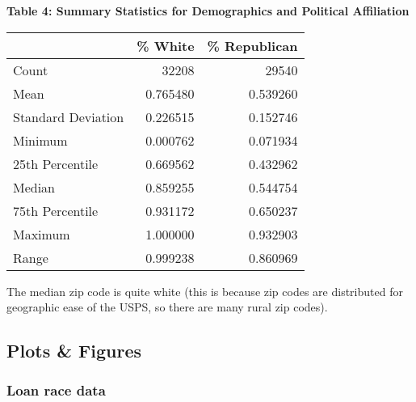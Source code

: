 \documentclass[11pt]{article}
\begin{document}
\begin{table}[H]
    \centering
    \textbf{Table 4: Summary Statistics for Demographics and Political Affiliation}\\
    \begin{tabular}{l|rr}\toprule
     & \% White & \% Republican \\\midrule
    Count & 32208 & 29540 \\
    Mean & 0.765480 & 0.539260 \\
    Standard Deviation & 0.226515 & 0.152746 \\
    Minimum & 0.000762 & 0.071934 \\
    25th Percentile & 0.669562 & 0.432962 \\
    Median & 0.859255 & 0.544754 \\
    75th Percentile & 0.931172 & 0.650237 \\
    Maximum & 1.000000 & 0.932903 \\
    Range & 0.999238 & 0.860969 \\\bottomrule
    \end{tabular}
\end{table}
The median zip code is quite white (this is because zip codes are distributed for geographic ease of the USPS, so there are many rural zip codes). 

    \subsection{Plots \& Figures}\label{plots-figures}

    \subsubsection{Loan race data}\label{loan-race-data}
\end{document}
